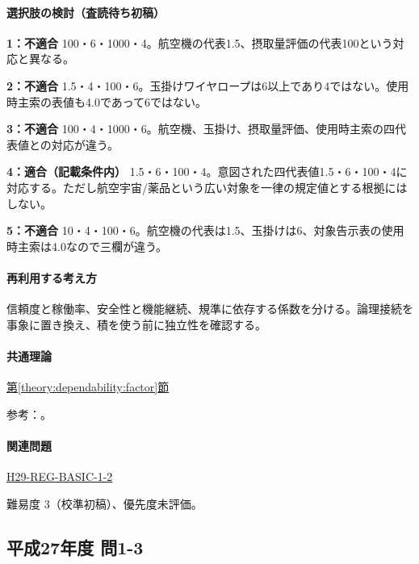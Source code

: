 \paragraph{選択肢の検討（査読待ち初稿）}\mbox{}\par

\noindent\textbf{1：不適合} 100・6・1000・4。航空機の代表1.5、摂取量評価の代表100という対応と異なる。\par

\noindent\textbf{2：不適合} 1.5・4・100・6。玉掛けワイヤロープは6以上であり4ではない。使用時主索の表値も4.0であって6ではない。\par

\noindent\textbf{3：不適合} 100・4・1000・6。航空機、玉掛け、摂取量評価、使用時主索の四代表値との対応が違う。\par

\noindent\textbf{4：適合（記載条件内）} 1.5・6・100・4。意図された四代表値1.5・6・100・4に対応する。ただし航空宇宙/薬品という広い対象を一律の規定値とする根拠にはしない。\par

\noindent\textbf{5：不適合} 10・4・100・6。航空機の代表は1.5、玉掛けは6、対象告示表の使用時主索は4.0なので三欄が違う。\par

\paragraph{再利用する考え方} 信頼度と稼働率、安全性と機能継続、規準に依存する係数を分ける。論理接続を事象に置き換え、積を使う前に独立性を確認する。

\paragraph{共通理論} \hyperref[theory:dependability:factor]{第\ref*{theory:dependability:factor}節}

\par 参考：\cite{design_faa_2011,design_mhlw_crane,design_fsc_adi,design_mlit_elevator}。

\paragraph{関連問題} \hyperref[q:h29-reg-basic-1-2]{H29-REG-BASIC-1-2}

\par 難易度 3（校準初稿）、優先度未評価。

\subsection{平成27年度 問1-3}
\label{q:h27-reg-basic-1-3}

